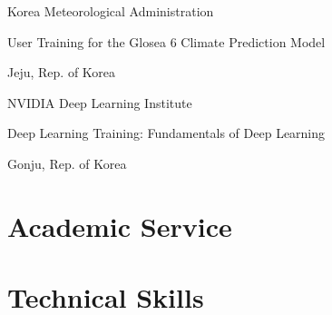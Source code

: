 \documentclass[11pt,usletter,sans]{moderncv}
\begin{document}
\vspace{0.5em}

        {Korea Meteorological Administration}
        {\parbox[t]{0.7\textwidth}{User Training for the Glosea 6 Climate Prediction Model}}
        {Jeju, Rep. of Korea}        %
        {}                           %
        {}                           %

\vspace{0.5em}

        {NVIDIA Deep Learning Institute}
        {\parbox[t]{0.7\textwidth}{Deep Learning Training: Fundamentals of Deep Learning}}
        {Gonju, Rep. of Korea}       %
        {}                           %
        {}                           %

\section{Academic Service}

\section{Technical Skills}

\end{document}
